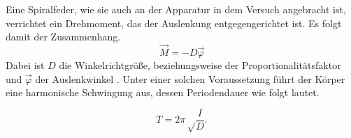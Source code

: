 \noindent
Eine Spiralfeder, wie sie auch an der Apparatur in dem Versuch angebracht ist, verrichtet ein Drehmoment, das der Auslenkung entgegengerichtet ist.
Es folgt damit der Zusammenhang.
\begin{equation}
    \label{eqn:winkelrichtgr}
    \vec M = -D \vec\varphi    
\end{equation} 
Dabei ist $D$ die Winkelrichtgröße, beziehungsweise der Proportionalitätsfaktor
und $\vec\varphi$ der Auslenkwinkel \cite{gerthsen}.
Unter einer solchen Voraussetzung führt der Körper eine harmonische Schwingung aus, dessen Periodendauer wie folgt lautet.

\begin{equation}
    \label{eqn:periode}
    T=2\pi\sqrt\frac{I}{D}.
\end{equation}
